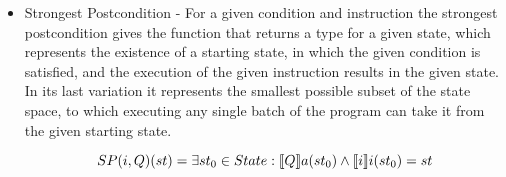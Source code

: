 \begin{itemize}
    \item Strongest Postcondition - For a given condition and instruction the strongest postcondition gives the function that returns a type for a given state, which represents the existence of a starting state, in which the given condition is satisfied, and the execution of the given instruction results in the given state.
    In its last variation it represents the smallest possible subset of the state space, to which executing any single batch of the program can take it from the given starting state.
    
    \begin{equation}
        SP(i, Q)(st) = \exists st_0 \in State : \llbracket Q \rrbracket a(st_0) \land \llbracket i \rrbracket i(st_0) = st
    \end{equation}
    \begin{code}
        \>[2]\AgdaSpace{}%
        \AgdaSymbol{:}\AgdaSpace{}%
        \AgdaSymbol{(}\AgdaSpace{}%
        \AgdaSpace{}%
        \AgdaSymbol{)}\AgdaSpace{}%
        \AgdaSpace{}%
        \<%
        \\
        \>[2]\AgdaSpace{}%
        \AgdaSymbol{(}\AgdaSpace{}%
        \AgdaOperator{\AgdaInductiveConstructor{,}}\AgdaSpace{}%
        \AgdaSymbol{)}\AgdaSpace{}%
        \AgdaSymbol{=}\AgdaSpace{}%
        \AgdaSpace{}%
        \AgdaSpace{}%
        \AgdaSpace{}%
        \AgdaSpace{}%
        \AgdaSpace{}%
        \AgdaSpace{}%
        \AgdaSpace{}%
        \AgdaSpace{}%
        \AgdaSpace{}%
        \AgdaSpace{}%
        \AgdaSpace{}%
        \AgdaSpace{}%
        \AgdaSpace{}%
        \AgdaSpace{}%
        \AgdaSpace{}%
        \AgdaSpace{}%
        \AgdaSpace{}%
        \AgdaSymbol{)}\<%
        \\
        \\[\AgdaEmptyExtraSkip]%
        \>[2]\AgdaSpace{}%
        \AgdaSymbol{:}\AgdaSpace{}%
        \AgdaSymbol{(}\AgdaSpace{}%

\end{code}
\end{itemize}
